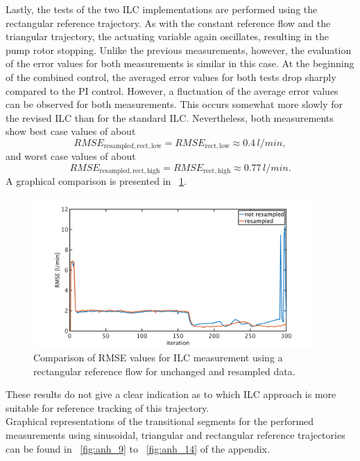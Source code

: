 Lastly, the tests of the two ILC implementations are performed using the rectangular reference trajectory.  As with the constant reference flow and the triangular trajectory, the actuating variable again oscillates, resulting in the pump rotor stopping.
Unlike the previous measurements, however, the evaluation of the error values for both measurements is similar in this case. At the beginning of the combined control, the averaged error values for both tests drop sharply compared to the PI control. However, a fluctuation of the average error values can be observed for both measurements. This occurs somewhat more slowly for the revised ILC than for the standard ILC. Nevertheless, both measurements show best case values of about
\begin{equation}
  RMSE_{\mathrm{resampled,rect,low}}=RMSE_{\mathrm{rect,low}}\approx0.4\,l/min,
\end{equation}
and worst case values of about
\begin{equation}
  RMSE_{\mathrm{resampled,rect,high}}=RMSE_{\mathrm{rect,high}}\approx0.77\,l/min.
\end{equation}
A graphical comparison is presented in \figurename~\ref{fig:RMSE_ilc_var_dist_comp_rect}.
\begin{figure}[ht!]
  \centering
  \includegraphics[width=0.95\textwidth]{images/chapt_5/ILC/RMSE_ilc_var_dist_comp_rect.pdf}
  \caption[Comparison of RMSE values for ILC measurement using a rectangular reference flow for unchanged and resampled data]{Comparison of RMSE values for ILC measurement using a rectangular reference flow for unchanged and resampled data.}
  \label{fig:RMSE_ilc_var_dist_comp_rect}
\end{figure}
These results do not give a clear indication as to which ILC approach is more suitable for reference tracking of this trajectory.
\\Graphical representations of the transitional segments for the performed measurements using sinusoidal, triangular and rectangular reference trajectories can be found in \figurename~\ref{fig:anh_9} to \figurename~\ref{fig:anh_14} of the appendix.

